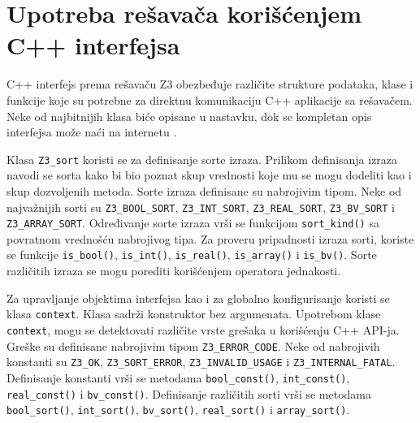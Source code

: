 \documentclass[12pt,oneside]{memoir}
\begin{document}
\section{Upotreba rešavača korišćenjem C++ interfejsa} \label{sec:num5}
C++ interfejs prema rešavaču Z3 obezbeđuje različite strukture podataka, klase i funkcije koje su potrebne za direktnu komunikaciju C++ aplikacije sa rešavačem. Neke od najbitnijih klasa biće opisane u nastavku, dok se kompletan opis interfejsa može naći na internetu \cite{cppapi}.

Klasa \texttt{Z3\_sort} koristi se za definisanje sorte izraza.  Prilikom definisanja izraza navodi se sorta kako bi bio poznat skup vrednosti koje mu se mogu dodeliti kao i skup dozvoljenih metoda. Sorte izraza definisane su nabrojivim tipom. Neke od najvažnijih sorti su \texttt{Z3\_BOOL\_SORT}, \texttt{Z3\_INT\_SORT}, \texttt{Z3\_REAL\_SORT}, \texttt{Z3\_BV\_SORT} i \texttt{Z3\_ARRAY\_SORT}. Određivanje sorte izraza vrši se funkcijom \texttt{sort\_kind()} sa povratnom vrednošću nabrojivog tipa. Za proveru pripadnosti izraza sorti, koriste se funkcije \texttt{is\_bool()}, \texttt{is\_int()}, \texttt{is\_real()}, \texttt{is\_array()} i \texttt{is\_bv()}. Sorte različitih izraza se mogu porediti korišćenjem operatora jednakosti. \par 

Za upravljanje objektima interfejsa kao i za globalno konfigurisanje koristi se klasa \texttt{context}. Klasa sadrži konstruktor bez argumenata. Upotrebom klase \texttt{context}, mogu se detektovati različite vrste grešaka u korišćenju C++ API-ja. Greške su definisane nabrojivim tipom \texttt{Z3\_ERROR\_CODE}. Neke od nabrojivih konstanti su \texttt{Z3\_OK}, \texttt{Z3\_SORT\_ERROR}, \texttt{Z3\_INVALID\_USAGE} i \texttt{Z3\_INTERNAL\_FATAL}. Definisanje konstanti vrši se metodama \texttt{bool\_const()}, \texttt{int\_const()}, \texttt{real\_const()} i \texttt{bv\_const()}.
Definisanje različitih sorti vrši se metodama \texttt{bool\_sort()}, \texttt{int\_sort()}, \texttt{bv\_sort()}, \texttt{real\_sort()} i \texttt{array\_sort()}. 
\par
\end{document}
